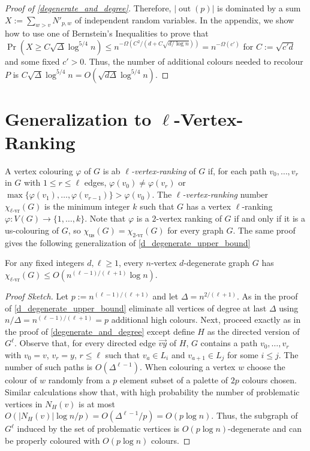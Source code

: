 \documentclass{patmorin}
\newcommand{\defin}[1]{\emph{\color{brightmaroon}#1}}
\DeclareMathOperator{\outn}{out}
\newcommand{\rn}[1]{\chi_{\operatorname{#1-vr}}}
\newcommand{\trn}{\chi_{\mathrm{us}}}
\newcommand{\lrn}{\rn{\ell}}
\begin{document}
\begin{proof}[Proof of \cref{degenerate_and_degree}]
  Therefore, $|\outn(p)|$ is dominated by a sum $X:=\sum_{w> v} N'_{p,w}$ of independent random variables.  In the appendix, we show how to use one of Bernstein's Inequalities to prove that $\Pr\left(X\ge C\sqrt{\Delta}\log^{5/4} n\right)\le n^{-\Omega(C^2/(d+C\sqrt{d/\log n}))} = n^{-\Omega(c')}$ for $C:=\sqrt{c'd}$ and some fixed $c'>0$.  Thus, the number of additional colours needed to recolour $P$ is $C\sqrt{\Delta}\log^{5/4} n = O(\sqrt{d\Delta}\log^{5/4} n)$.
\end{proof}

\section{Generalization to $\ell$-Vertex-Ranking}

A vertex colouring $\varphi$ of $G$ is ab \defin{$\ell$-vertex-ranking} of $G$ if, for each path $v_0,\ldots,v_r$ in $G$ with $1\le r\le\ell$ edges, $\varphi(v_0)\neq \varphi(v_r)$ or $\max\{\varphi(v_1),\ldots,\varphi(v_{r-1})\}>\varphi(v_0)$.  The \defin{$\ell$-vertex-ranking} number $\lrn(G)$ is the minimum integer $k$ such that $G$ has a vertex $\ell$-ranking $\varphi:V(G)\to\{1,\ldots,k\}$.  Note that $\varphi$ is a $2$-vertex ranking of $G$ if and only if it is a us-colouring of $G$, so $\trn(G)=\rn{2}(G)$ for every graph $G$.  The same proof gives the following generalization of \cref{d_degenerate_upper_bound}

\begin{thm}
  For any fixed integers $d,\ell\ge 1$, every $n$-vertex $d$-degenerate graph $G$ has $\lrn(G) \le O(n^{(\ell-1)/(\ell+1)}\log  n)$.
\end{thm}

\begin{proof}[Proof Sketch]
  Let $p:=n^{(\ell-1)/(\ell+1)}$ and let $\Delta=n^{2/(\ell+1)}$.  As in the proof of \cref{d_degenerate_upper_bound} eliminate all vertices of degree at last $\Delta$ using $n/\Delta = n^{(\ell-1)/(\ell+1)}=p$ additional high colours.  Next, proceed exactly as in the proof of \cref{degenerate_and_degree} except define $H$ as the directed version of $G^{\ell}$.  Observe that, for every directed edge $\overrightarrow{vy}$ of $H$, $G$ contains a path $v_0,\ldots,v_r$ with $v_0=v$, $v_r=y$, $r\le \ell$ such that $v_a\in L_i$ and $v_{a+1}\in L_j$ for some $i\le j$.  The number of such paths is $O(\Delta^{\ell-1})$. When colouring a vertex $w$ choose the colour of $w$ randomly from a $p$ element subset of a palette of $2p$ colours chosen.  Similar calculations show that, with high probability the number of problematic vertices in $N_H(v)$ is at most $O(|N_H(v)|\log n/p)=O(\Delta^{\ell-1}/p)=O(p\log n)$.  Thus, the subgraph of $G^\ell$ induced by the set of problematic vertices is $O(p\log n)$-degenerate and can be properly coloured with $O(p\log n)$ colours.
\end{proof}
\end{document}
